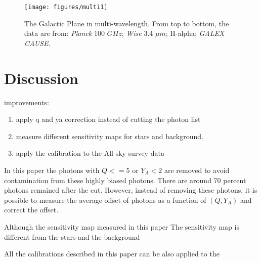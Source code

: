\documentclass[12pt, preprint]{aastex}
\newcommand{\project}[1]{\textsl{#1}}
\newcommand{\cause}{\project{GALEX CAUSE}}
\begin{document}
\begin{figure}[p]
\begin{center}
\texttt{[image: figures/multi1]}
\end{center}
\caption{
  \label{map4}
  The Galactic Plane in multi-wavelength. From top to bottom, the data are from:
  \project{Planck} 100 $GHz$; \project{Wise} 3.4 $\mu m$; H-alpha; \cause.
}
\end{figure}

\section{Discussion}
\label{ds}
improvements:
\begin{enumerate}
\item apply q and ya correction instead of cutting the photon list
\item measure different sensitivity maps for stars and background.
\item apply the calibration to the All-sky survey data
\end{enumerate}

In this paper the photons with $Q<=5$ or $Y_A<2$ are removed to avoid contamination from these highly biased photons.
There are around 70 percent photons remained after the cut.
However, instead of removing these photons, it is possible to measure the average offset of photons as a function of $(Q, Y_A)$ and correct the offset.

Although the sensitivity map measured in this paper 
The sensitivity map is different from the stars and the background

All the calibrations described in this paper can be also applied to the 

\clearpage

\clearpage
\end{document}
